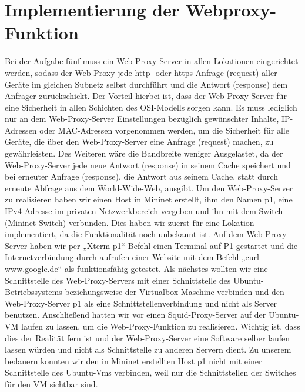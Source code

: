 \documentclass[fontsize=12pt,paper=a4,open=any,parskip=half,
  twoside=false,toc=listof,toc=bibliography,fleqn,leqno,
  captions=nooneline,captions=tableabove,british]{scrbook}
\begin{document}
\section{Implementierung der Webproxy-Funktion}
Bei der Aufgabe fünf muss ein Web-Proxy-Server in allen Lokationen eingerichtet werden, sodass der Web-Proxy jede http- oder https-Anfrage (request) aller Geräte im gleichen Subnetz selbst durchführt und die Antwort (response) dem Anfrager zurückschickt. Der Vorteil hierbei ist, dass der Web-Proxy-Server für eine Sicherheit in allen Schichten des OSI-Modells sorgen kann. Es muss lediglich nur an dem Web-Proxy-Server Einstellungen bezüglich gewünschter Inhalte, IP-Adressen oder MAC-Adressen vorgenommen werden, um die Sicherheit für alle Geräte, die über den Web-Proxy-Server eine Anfrage (request) machen, zu gewährleisten. Des Weiteren wäre die Bandbreite weniger Ausgelastet, da der Web-Proxy-Server jede neue Antwort (response) in seinem Cache speichert und bei erneuter Anfrage (response), die Antwort aus seinem Cache, statt durch erneute Abfrage aus dem World-Wide-Web, ausgibt.
Um den Web-Proxy-Server zu realisieren haben wir einen Host in Mininet erstellt, ihm den Namen p1, eine IPv4-Adresse im privaten Netzwerkbereich vergeben und ihn mit dem Switch (Mininet-Switch) verbunden. Dies haben wir zuerst für eine Lokation implementiert, da die Funktionalität noch unbekannt ist. Auf dem Web-Proxy-Server haben wir per „Xterm p1“ Befehl einen Terminal auf P1 gestartet und die Internetverbindung durch aufrufen einer Website mit dem Befehl „curl www.google.de“ als funktionsfähig getestet.
Als nächstes wollten wir eine Schnittstelle des Web-Proxy-Servers mit einer Schnittstelle des Ubuntu-Betriebssystems beziehungsweise der Virtualbox-Maschine verbinden und den Web-Proxy-Server p1 als eine Schnittstellenverbindung und nicht als Server benutzen. Anschließend hatten wir vor einen Squid-Proxy-Server auf der Ubuntu-VM laufen zu lassen, um die Web-Proxy-Funktion zu realisieren. Wichtig ist, dass dies der Realität fern ist und der Web-Proxy-Server eine Software selber laufen lassen würden und nicht als Schnittstelle zu anderen Servern dient. Zu unserem bedauern konnten wir den in Mininet erstellten Host p1 nicht mit einer Schnittstelle des Ubuntu-Vms verbinden, weil nur die Schnittstellen der Switches für den VM sichtbar sind.
\end{document}
